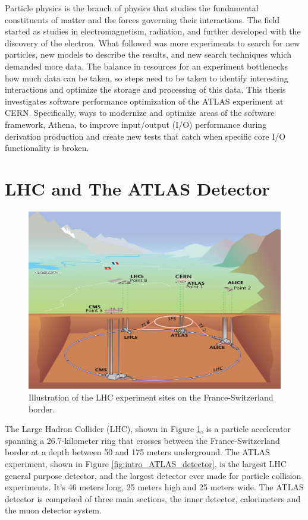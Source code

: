 Particle physics is the branch of physics that studies the fundamental constituents of matter and the forces governing their interactions.  
The field started as studies in electromagnetism, radiation, and further developed with the discovery of the electron.
What followed was more experiments to search for new particles, new models to describe the results, and new search techniques which demanded more data.
The balance in resources for an experiment bottlenecks how much data can be taken, so steps need to be taken to identify interesting interactions and optimize the storage and processing of this data.
This thesis investigates software performance optimization of the ATLAS experiment at CERN. 
Specifically, ways to modernize and optimize areas of the software framework, Athena, to improve input/output (I/O) performance during derivation production and create new tests that catch when specific core I/O functionality is broken.

\section{LHC and The ATLAS Detector}

\begin{figure}[h]
    \centering
    \includegraphics[width=.8\textwidth]{content/img/LHC illustration.jpg}
    \caption{Illustration of the LHC experiment sites on the France-Switzerland border.\cite{LHC_Illustration}}
    \label{fig:intro_LHC_sites}
\end{figure}

The Large Hadron Collider (LHC), shown in Figure \ref{fig:intro_LHC_sites},  is a particle accelerator spanning a 26.7-kilometer ring that crosses between the France-Switzerland border at a depth between 50 and 175 meters underground.\cite{LHC_faq_guide}
The ATLAS experiment, shown in Figure \ref{fig:intro_ATLAS_detector}, is the largest LHC general purpose detector, and the largest detector ever made for particle collision experiments. 
It's 46 meters long, 25 meters high and 25 meters wide.\cite{ATLAS_Fact_Sheet}
The ATLAS detector is comprised of three main sections, the inner detector, calorimeters and the muon detector system. 


